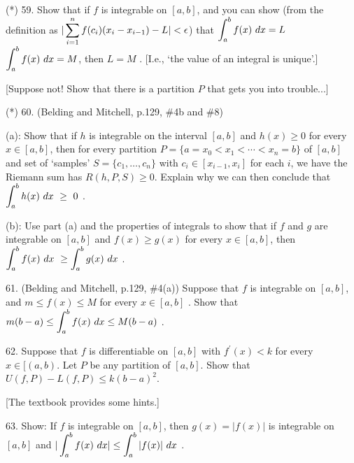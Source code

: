 \documentclass[12pt]{article}
\begin{document}
\begin{description}


\item{(*) 59.} Show that if $f$ is integrable on $[a,b]$, and you can show
(from the definition as $\displaystyle|\sum_{i=1}^n f(c_i)(x_i-x_{i-1})-L|<\epsilon$) 
that $\displaystyle\int_a^b f(x)\ dx = L$  $\displaystyle\int_a^b f(x)\ dx = M$, 
then $L=M$ . [I.e., `the value of an integral is unique'.]

\ssk

\item{\spc} [Suppose not! Show that there is a partition $P$ that gets you into trouble...]

\msk

\item{(*) 60.} (Belding and Mitchell, p.129, \#4b and \#8) 

(a): Show that if $h$ is integrable on the interval $[a,b]$ and
$h(x)\geq 0$ for every $x\in [a,b]$, then for every partition $P=\{a=x_0<x_1<\cdots <x_n=b\}$ of $[a,b]$  
and set of `samples' $S = \{c_1,\ldots,c_n\}$ with $c_i\in [x_{i-1},x_i]$ for each $i$, we have
the Riemann sum has
$R(h,P,S)\geq 0$. Explain why we can then conclude that $\displaystyle\int_a^b h(x)\ dx\ \geq\ 0$ .

\ssk

\item{\spc} (b): Use part (a) and the properties of integrals to show that if 
$f$ and $g$ are integrable on $[a,b]$ and $f(x)\geq g(x)$ for every $x\in[a,b]$, then 
$\displaystyle \int_a^b f(x)\ dx\ \geq \int_a^b g(x)\ dx$ .
 
\msk

\item{61.} (Belding and Mitchell, p.129, \#4(a)) Suppose that $f$ is integrable on $[a,b]$, and 
$m\leq f(x)\leq M$ for every $x\in[a,b]$ . Show that 
$\dsp m(b-a)\leq \int_a^b f(x)\ dx  \leq M(b-a)$ .

\msk

\item{62.} Suppose that $f$ is differentiable on $[a,b]$ with $f^\prime(x)<k$ for every $x\in[(a,b)$. 
Let $P$ be any
partition of $[a,b]$. Show that $U(f,P)-L(f,P)\leq k(b-a)^2$. 

\ssk

\item{\spc} [The textbook provides some hints.]

\msk

\item{63.} Show: If $f$ is integrable on $[a,b]$, then $g(x)=|f(x)|$ is integrable on $[a,b]$ and
$\displaystyle|\int_a^b f(x)\ dx|\leq \int_a^b|f(x)|\ dx$ .


\end{description}
\end{document}
